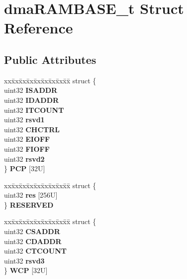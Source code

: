 \hypertarget{structdmaRAMBASE__t}{}\section{dma\+R\+A\+M\+B\+A\+S\+E\+\_\+t Struct Reference}
\label{structdmaRAMBASE__t}
\subsection*{Public Attributes}
\begin{DoxyCompactItemize}
\item 
\mbox{\label{structdmaRAMBASE__t_ad069a94081b970fbc453339d87e28588}} 
\begin{tabbing}
xx\=xx\=xx\=xx\=xx\=xx\=xx\=xx\=xx\=\kill
struct \{\\
\>uint32 {\bfseries ISADDR}\\
\>uint32 {\bfseries IDADDR}\\
\>uint32 {\bfseries ITCOUNT}\\
\>uint32 {\bfseries rsvd1}\\
\>uint32 {\bfseries CHCTRL}\\
\>uint32 {\bfseries EIOFF}\\
\>uint32 {\bfseries FIOFF}\\
\>uint32 {\bfseries rsvd2}\\
\} {\bfseries PCP} \mbox{[}32U\mbox{]}\\

\end{tabbing}\item 
\mbox{\label{structdmaRAMBASE__t_a50f5c8b486d91a0d6eeb1ce45768a4dd}} 
\begin{tabbing}
xx\=xx\=xx\=xx\=xx\=xx\=xx\=xx\=xx\=\kill
struct \{\\
\>uint32 {\bfseries res} \mbox{[}256U\mbox{]}\\
\} {\bfseries RESERVED}\\

\end{tabbing}\item 
\mbox{\label{structdmaRAMBASE__t_ab043eaf8ee4e1ee0f9add57d1f59215c}} 
\begin{tabbing}
xx\=xx\=xx\=xx\=xx\=xx\=xx\=xx\=xx\=\kill
struct \{\\
\>uint32 {\bfseries CSADDR}\\
\>uint32 {\bfseries CDADDR}\\
\>uint32 {\bfseries CTCOUNT}\\
\>uint32 {\bfseries rsvd3}\\
\} {\bfseries WCP} \mbox{[}32U\mbox{]}\\

\end{tabbing}\end{DoxyCompactItemize}


